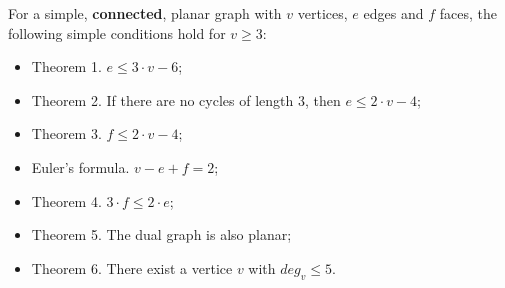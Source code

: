For a simple, \textbf{connected}, planar graph with $v$ vertices, $e$ edges and $f$ faces, the following simple conditions hold for $v \ge 3$:
\begin{itemize}
\item Theorem 1. $e \le 3 \cdot v - 6$;
\item Theorem 2. If there are no cycles of length 3, then $e \le 2 \cdot v - 4$;
\item Theorem 3. $f \le 2 \cdot v - 4$;
\item Euler's formula. $v - e + f = 2$;
\item Theorem 4. $3 \cdot f \le 2 \cdot e$;
\item Theorem 5. The dual graph is also planar;
\item Theorem 6. There exist a vertice $v$ with $deg_v \le 5$.
\end{itemize}
